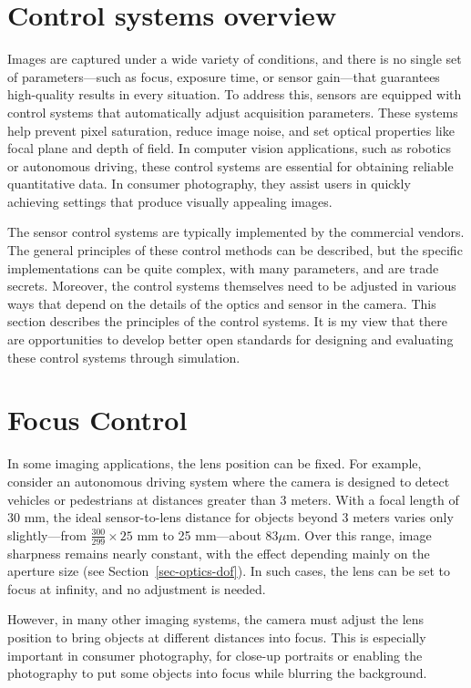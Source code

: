 \documentclass[
  letterpaper,
]{book}
\begin{document}
\section{Control systems overview}\label{sec-sensor-control-overview}

Images are captured under a wide variety of conditions, and there is no
single set of parameters---such as focus, exposure time, or sensor
gain---that guarantees high-quality results in every situation. To
address this, sensors are equipped with control systems that
automatically adjust acquisition parameters. These systems help prevent
pixel saturation, reduce image noise, and set optical properties like
focal plane and depth of field. In computer vision applications, such as
robotics or autonomous driving, these control systems are essential for
obtaining reliable quantitative data. In consumer photography, they
assist users in quickly achieving settings that produce visually
appealing images.

The sensor control systems are typically implemented by the commercial
vendors. The general principles of these control methods can be
described, but the specific implementations can be quite complex, with
many parameters, and are trade secrets. Moreover, the control systems
themselves need to be adjusted in various ways that depend on the
details of the optics and sensor in the camera. This section describes
the principles of the control systems. It is my view that there are
opportunities to develop better open standards for designing and
evaluating these control systems through simulation.

\section{Focus Control}\label{sec-focus-control}

In some imaging applications, the lens position can be fixed. For
example, consider an autonomous driving system where the camera is
designed to detect vehicles or pedestrians at distances greater than 3
meters. With a focal length of 30 mm, the ideal sensor-to-lens distance
for objects beyond 3 meters varies only slightly---from
\(\frac{300}{299} \times 25\) mm to 25 mm---about \(83 \mu \text{m}\).
Over this range, image sharpness remains nearly constant, with the
effect depending mainly on the aperture size (see
Section~\ref{sec-optics-dof}). In such cases, the lens can be set to
focus at infinity, and no adjustment is needed.

However, in many other imaging systems, the camera must adjust the lens
position to bring objects at different distances into focus. This is
especially important in consumer photography, for close-up portraits or
enabling the photography to put some objects into focus while blurring
the background.
\end{document}
